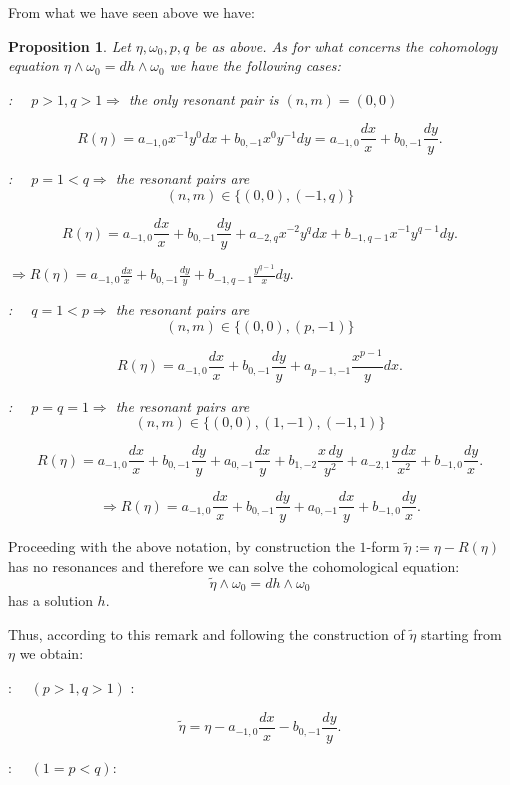 \documentclass[11pt,a4paper]{amsart}
\newtheorem{proposition}[theorem]{Proposition}
\theoremstyle{definition}
\begin{document}
From what we have seen above we have:
\begin{proposition} Let $\eta, \omega_0, p,q$ be as above. As for what concerns the 
cohomology equation $ \eta \wedge \omega_0 = dh \wedge \omega_0$ we have the following cases:

 : $\quad p>1,q>1 \Rightarrow$ the only resonant pair is $(n,m)=(0,0)$

\[
R(\eta)
=
a_{-1,0} x^{-1}y^0 dx + b_{0,-1} x^0 y^{-1} dy
=
a_{-1,0}\frac{dx}{x} + b_{0,-1}\frac{dy}{y}.
\]

 : $\quad p=1<q \Rightarrow$ the resonant pairs are
\[
(n,m)\in\{(0,0),(-1,q)\}
\]

\[
R(\eta)
=
a_{-1,0}\frac{dx}{x} + b_{0,-1}\frac{dy}{y}
+
a_{-2,q} x^{-2} y^q dx
+
b_{-1,q-1} x^{-1} y^{q-1} dy.
\]

$\Rightarrow R(\eta)
=
a_{-1,0}\frac{dx}{x}
+
b_{0,-1}\frac{dy}{y}
+
b_{-1,q-1}\frac{y^{q-1}}{x}dy.$

 : $\quad q=1<p \Rightarrow$ the resonant pairs are
\[
(n,m)\in\{(0,0),(p,-1)\}
\]

\[
R(\eta)
=
a_{-1,0}\frac{dx}{x}
+
b_{0,-1}\frac{dy}{y}
+
a_{p-1,-1}\frac{x^{p-1}}{y}dx.
\]

 : $\quad p=q=1 \Rightarrow$ the resonant pairs are
\[
(n,m)\in\{(0,0),(1,-1),(-1,1)\}
\]

\[
R(\eta)
=
a_{-1,0}\frac{dx}{x}
+
b_{0,-1}\frac{dy}{y}
+
a_{0,-1}\frac{dx}{y}
+
b_{1,-2}\frac{x\,dy}{y^2}
+
a_{-2,1}\frac{y\,dx}{x^2}
+
b_{-1,0}\frac{dy}{x}.
\]

\[
\Rightarrow R(\eta)
=
a_{-1,0}\frac{dx}{x}
+
b_{0,-1}\frac{dy}{y}
+
a_{0,-1}\frac{dx}{y}
+
b_{-1,0}\frac{dy}{x}.
\]
\end{proposition}


Proceeding with the above notation, by construction the $1$-form $\tilde{\eta} := \eta - R(\eta)$ has no resonances and therefore
we can solve the cohomological equation:
\[
\tilde{\eta}\wedge \omega_0 = dh \wedge \omega_0
\]
has a solution $h$.


Thus, according to this remark and following the construction of
$\tilde{\eta}$ starting from $\eta$ we obtain:

 : $\quad (p>1,q>1)$ :

\[
\tilde{\eta}
=
\eta
-
a_{-1,0}\frac{dx}{x}
-
b_{0,-1}\frac{dy}{y}.
\]

 : $\quad (1=p<q) :$
\end{document}
